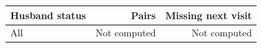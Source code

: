 \begin{tabular}{l
rr
}
\toprule
Husband status & Pairs & Missing next visit
\\
\midrule
All & Not computed & Not computed
\\
\bottomrule
\end{tabular}
